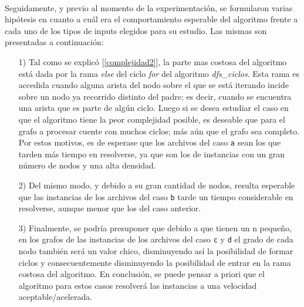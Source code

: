 \paragraph{}
Seguidamente, y previo al momento de la experimentación, se formularon varias hipótesis en cuanto a cuál era el comportamiento esperable del algoritmo frente a cada uno de los tipos de inputs elegidos para su estudio. Las mismas son presentadas a continuación:
	\begin{itemize}
		\item[1)]{Tal como se explicó [\ref{complejidad2}], la parte mas costosa del algoritmo está dada por la rama \textit{else} del ciclo \textit{for} del algoritmo \textit{dfs\_ciclos}. Esta rama es accedida cuando alguna arista del nodo sobre el que se está iterando incide sobre un nodo ya recorrido distinto del padre; es decir, cuando se encuentra una arista que es parte de algún ciclo. Luego si se desea estudiar el caso en que el algoritmo tiene la peor complejidad posible, es deseable que para el grafo a procesar cuente con muchos ciclos; más aún que el grafo sea completo. Por estos motivos, es de esperase que los archivos del caso \texttt{a} sean los que tarden más tiempo en resolverse, ya que son los de instancias con un gran número de nodos y una alta densidad.}
		\item[2)]{Del mismo modo, y debido a su gran cantidad de nodos, resulta esperable que las instancias de los archivos del caso \texttt{b} tarde un tiempo considerable en resolverse, aunque menor que los del caso anterior.} 
		\item[3)]{Finalmente, se podría presuponer que debido a que tienen un n pequeño, en los grafos de las instancias de los archivos del caso \texttt{c} y \texttt{d} el grado de cada nodo también será un valor chico, disminuyendo así la posibilidad de formar ciclos y consecuentemente disminuyendo la posibilidad de entrar en la rama costosa del algoritmo. En conclusión, se puede pensar a priori que el algoritmo para estos casos resolverá las instancias a una velocidad aceptable/acelerada.}
	\end{itemize}

